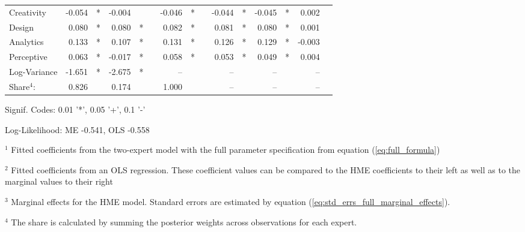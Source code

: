\documentclass[12pt]{article}
\theoremstyle{definition}
\begin{document}
\begin{landscape}
\begin{table}
\begin{threeparttable}
\begin{tabular}[l]{l r l r l c r l c r l r l r l}
Creativity             & -0.054 & *      & -0.004 &       && -0.046 & *     && -0.044 & *        & -0.045 & *        &  0.002 &        \\
Design                 &  0.080 & *      &  0.080 & *     &&  0.082 & *     &&  0.081 & *        &  0.080 & *        &  0.001 &        \\
Analytics              &  0.133 & *      &  0.107 & *     &&  0.131 & *     &&  0.126 & *        &  0.129 & *        & -0.003 &        \\
Perceptive             &  0.063 & *      & -0.017 & *     &&  0.058 & *     &&  0.053 & *        &  0.049 & *        &  0.004 &        \\
Log-Variance           & -1.651 & *      & -2.675 & *     &&  --    &       &&  --    &          &  --    &          &  --    &        \\
                \cmidrule(l){2-3} \cmidrule(l){4-5} \cmidrule(l){7-8} \cmidrule(l){10-11} \cmidrule(l){12-13} \cmidrule(l){14-15}
Share$^{4}$:          &  0.826 &        &  0.174 &       &&  1.000 &       &&  --    &          &  --    &          &  --    &        \\
\cmidrule{1-15}
      \end{tabular}

      \begin{tablenotes}
        \item Signif. Codes: 0.01 '*', 0.05 '+', 0.1 '-'
        \item Log-Likelihood: ME -0.541, OLS -0.558
        \item $^{1}$ Fitted coefficients from the two-expert model with the full parameter specification from equation (\ref{eq:full_formula})
        \item $^{2}$ Fitted coefficients from an OLS regression. These coefficient values can be compared to the HME coefficients to their left as well as to the marginal values to their right
        \item $^{3}$ Marginal effects for the HME model. Standard errors are estimated by equation (\ref{eq:std_errs_full_marginal_effects}).
        \item $^{4}$ The share is calculated by summing the posterior weights across observations for each expert.

      \end{tablenotes} \label{tbl:2E_full_regressions_results}


    \end{threeparttable}

\end{table}
\end{landscape}
\end{document}
